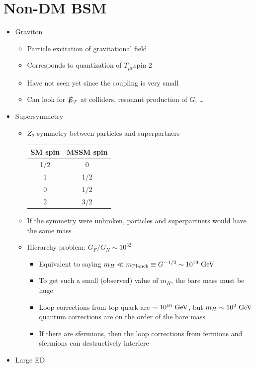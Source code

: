 \section{Non-DM BSM}
\begin{itemize}
  \item Graviton
  \begin{itemize}
    \item Particle excitation of gravitational field
    \item Corresponds to quantization of $T_{\mu\nu}$\thus spin 2
    \item Have not seen yet since the coupling is very small
    \item Can look for $\slashed E_T$ at colliders, resonant production of $G$, \dots
  \end{itemize}
  \item Supersymmetry
  \begin{itemize}
     \item $Z_2$ symmetry between particles and superpartners
     \begin{center}
     \begin{tabular}{c|c}
      SM spin & MSSM spin\\ \hline
      1/2 & 0\\
      1 & 1/2\\
      0 & 1/2\\
      2 & 3/2
     \end{tabular}
     \end{center}
     \item If the symmetry were unbroken, particles and superpartners would have the same mass
     \item Hierarchy problem: $G_F/G_N \sim 10^{32}$
     \begin{itemize}
       \item Equivalent to saying $m_H \ll m_\text{Planck} \equiv G^{-1/2} \sim 10^{19}~\text{GeV}$
       \item To get such a small (observed) value of $m_H$, the bare mass must be huge
       \item Loop corrections from top quark are $\sim 10^{16}~\text{GeV}$, but $m_H \sim 10^2~\text{GeV}$ \thus quantum corrections are on the order of the bare mass
       \item If there are sfermions, then the loop corrections from fermions and sfermions can destructively interfere
     \end{itemize}
   \end{itemize} 
   \item Large ED

\end{itemize}
